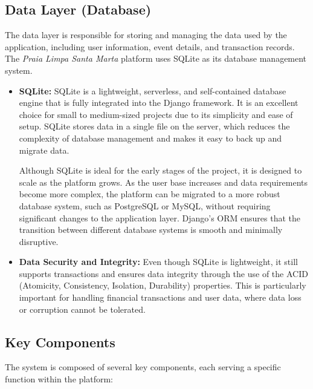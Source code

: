 \subsection{Data Layer (Database)}

The data layer is responsible for storing and managing the data used by the application, including user information, event details, and transaction records. The \textit{Praia Limpa Santa Marta} platform uses SQLite\cite{sqlite} as its database management system.

\begin{itemize}
    \item \textbf{SQLite:} SQLite is a lightweight, serverless, and self-contained database engine that is fully integrated into the Django framework. It is an excellent choice for small to medium-sized projects due to its simplicity and ease of setup. SQLite stores data in a single file on the server, which reduces the complexity of database management and makes it easy to back up and migrate data.

    Although SQLite is ideal for the early stages of the project, it is designed to scale as the platform grows. As the user base increases and data requirements become more complex, the platform can be migrated to a more robust database system, such as PostgreSQL or MySQL, without requiring significant changes to the application layer. Django's ORM ensures that the transition between different database systems is smooth and minimally disruptive.

    \item \textbf{Data Security and Integrity:} Even though SQLite is lightweight, it still supports transactions and ensures data integrity through the use of the ACID (Atomicity, Consistency, Isolation, Durability) properties. This is particularly important for handling financial transactions and user data, where data loss or corruption cannot be tolerated.
\end{itemize}


\subsection{Key Components}

The system is composed of several key components, each serving a specific function within the platform:

